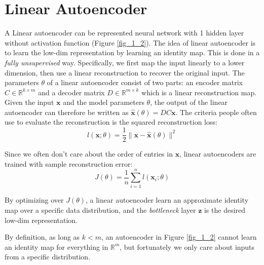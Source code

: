 \documentclass[../book-template.tex]{subfiles}
\begin{document}
\section{Linear Autoencoder}
A Linear autoencoder can be represented neural network with 1 hidden layer without activation function (Figure \ref{fig_1_2}). The idea of linear autoencoder is to learn the low-dim representation by learning an identity map. This is done in a \emph{fully unsupervised} way. Specifically, we first map the input linearly to a lower dimension, then use a linear reconstruction to recover the original input. The parameters $\theta$ of a linear autoencoder consist of two parts: an encoder matrix $C\in \mathbb{R}^{k\times m}$ and a decoder matrix $D\in \mathbb{R}^{m\times k}$ which is a linear reconstruction map. Given the input $\bm{x}$ and the model parameters $\theta$, the output of the linear autoencoder can therefore be written as $\hat{\bm{x}}(\theta)=DC\bm{x}$. The criteria people often use to evaluate the reconstruction is the squared reconstruction loss:
\begin{equation*}
    l(\bm{x};\theta)=\frac{1}{2}\|\bm{x}-\hat{\bm{x}}(\theta)\|^2
\end{equation*}
\par Since we often don't care about the order of entries in $\bm{x}$, linear autoencoders are trained with sample reconstruction error:
\begin{equation*}
    J(\theta)=\frac{1}{n}\sum_{i=1}^{n}l(\bm{x}_i;\theta)
\end{equation*}
\par By optimizing over $J(\theta)$, a linear autoencoder learn an approximate identity map over a specific data distribution, and the \emph{bottleneck} layer $\bm{z}$ is the desired low-dim representation.

\begin{remark}
By definition, as long as $k<m$, an autoencoder in Figure \ref{fig_1_2} cannot learn an identity map for everything in $\mathbb{R}^m$, but fortunately we only care about inputs from a specific distribution. 
\end{remark}
\end{document}
